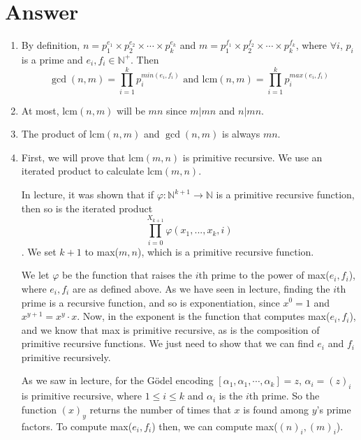 \documentclass{article}
\newcommand{\nat}{\mathbb{N}}
\newcommand{\lcm}{\mathrm{lcm}}
\begin{document}
\section*{Answer}
\begin{enumerate}[label=\alph*)]
\item By definition,
  $n = p_1^{e_1} \times p_2^{e_2} \times \cdots \times p_k^{e_k}$ and
  $m = p_1^{f_1} \times p_2^{f_2} \times \cdots \times p_k^{f_k}$,
  where $\forall i$, $p_i$ is a prime and $e_i, f_i \in \nat^+$.
  Then
  $$ 
    \gcd(n, m) = \prod_{i=1}^k p_i^{min(e_i,f_i)} 
    \text{ and } 
    \lcm(n,m) = \prod_{i=1}^k p_i^{max(e_i,f_i)}
  $$

\item At most, $\lcm(n, m)$ will be $mn$ since $m|mn$ and $n|mn$.

\item The product of $\lcm(n, m)$ and $\gcd(n, m)$ is always $mn$.

\item First, we will prove that $\lcm(m,n)$ is primitive recursive. We
  use an iterated product to calculate $\lcm(m,n)$.

  In lecture, it was shown that if $\varphi : \nat^{k+1} \to \nat$ is
  a primitive recursive function, then so is the iterated
  product $$\prod_{i=0}^{X_{k+1}} \varphi(x_1,...,x_k,i)$$. We set
  $k+1$ to max($m,n$), which is a primitive recursive function.

  We let $\varphi$ be the function that raises the $i$th prime to the
  power of max($e_i,f_i$), where $e_i,f_i$ are as defined above. As we
  have seen in lecture, finding the $i$th prime is a recursive
  function, and so is exponentiation, since $x^0 = 1$ and $x^{y+1} =
  x^y \cdot x$. Now, in the exponent is the function that computes
  max($e_i,f_i$), and we know that max is primitive recursive, as is
  the composition of primitive recursive functions. We just need to
  show that we can find $e_i$ and $f_i$ primitive recursively.

  As we saw in lecture, for the G\"odel encoding $[\alpha_1, \alpha_1,
    \cdots, \alpha_k] = z$, $\alpha_i = (z)_i$ is primitive recursive,
  where $1 \leq i \leq k$ and $\alpha_i$ is the $i$th prime. So the
  function $(x)_y$ returns the number of times that $x$ is found among
  $y$'s prime factors. To compute max($e_i,f_i$) then, we can compute
  max($(n)_i,(m)_i$).



\end{enumerate}
\end{document}
